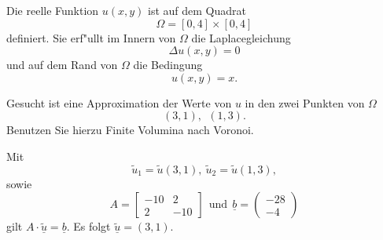 Die reelle Funktion $u(x,y)$ ist auf dem Quadrat
\[
\Omega = [0, 4] \times [0,4]
\]
definiert.
Sie erf"ullt im Innern von $\Omega$ die Laplacegleichung
\[
\Delta u(x,y) = 0
\]
und auf dem Rand von $\Omega$ die Bedingung
\[
u(x,y) = x.
\]

Gesucht ist eine Approximation der Werte von $u$ in den zwei Punkten von
$\Omega$
\[
(3,1), \ \    (1,3).
\]
Benutzen Sie hierzu Finite Volumina nach Voronoi.  

\begin{loesung}
Mit 
\[
\tilde u_1 = \tilde u(3,1), \ \tilde u_2 = \tilde u(1,3),
\]
sowie 
\[
A = \left[\begin{array}{rr} 
-10 & 2   \\
 2 & -10 \end{array}\right] \ \ \mbox{und} \ \
\underline{b} =  \left(\begin{array}{r} -28 \\ -4 \end{array}\right)
\]
gilt $A \cdot \underline{\tilde u} = \underline{b}.$
Es folgt $\underline{\tilde u} = (3, 1).$
\end{loesung}

